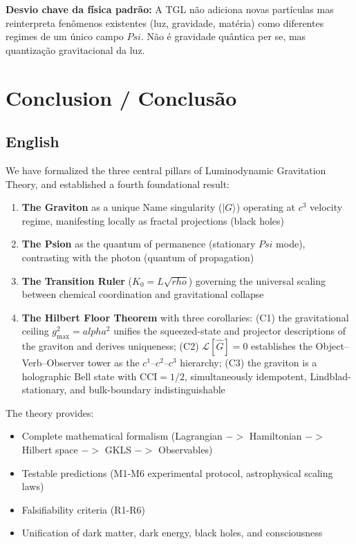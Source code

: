 \documentclass[12pt,a4paper]{article}
\def\Psi{Psi}%
\def\to{ -> }%
\def\alpha{alpha}%
\def\rho{rho}%
\begin{document}
\textbf{Desvio chave da física padrão:} A TGL não adiciona novas partículas mas reinterpreta fenômenos existentes (luz, gravidade, matéria) como diferentes regimes de um único campo $\Psi$. Não é gravidade quântica per se, mas quantização gravitacional da luz.


\section{Conclusion / Conclusão}

\subsection{English}

We have formalized the three central pillars of Luminodynamic Gravitation Theory, and established a fourth foundational result:

\begin{enumerate}
    \item \textbf{The Graviton} as a unique Name singularity ($|G\rangle$) operating at $c^3$ velocity regime, manifesting locally as fractal projections (black holes)
    
    \item \textbf{The Psion} as the quantum of permanence (stationary $\Psi$ mode), contrasting with the photon (quantum of propagation)
    
    \item \textbf{The Transition Ruler} ($K_0 = L\sqrt{\rho}$) governing the universal scaling between chemical coordination and gravitational collapse

    \item \textbf{The Hilbert Floor Theorem} with three corollaries: (C1) the gravitational ceiling $g_{\max}^2 = \alpha^2$ unifies the squeezed-state and projector descriptions of the graviton and derives uniqueness; (C2) $\mathcal{L}[\hat{G}] = 0$ establishes the Object--Verb--Observer tower as the $c^1$--$c^2$--$c^3$ hierarchy; (C3) the graviton is a holographic Bell state with $\mathrm{CCI} = 1/2$, simultaneously idempotent, Lindblad-stationary, and bulk-boundary indistinguishable
\end{enumerate}

The theory provides:
\begin{itemize}
    \item Complete mathematical formalism (Lagrangian $\to$ Hamiltonian $\to$ Hilbert space $\to$ GKLS $\to$ Observables)
    \item Testable predictions (M1-M6 experimental protocol, astrophysical scaling laws)
    \item Falsifiability criteria (R1-R6)
    \item Unification of dark matter, dark energy, black holes, and consciousness
\end{itemize}
\end{document}

